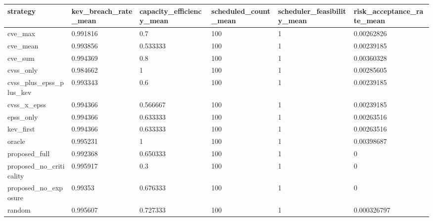 \begin{tabular}{l l l l l l}
\hline
strategy & kev\_breach\_rate\_mean & capacity\_efficiency\_mean & scheduled\_count\_mean & scheduler\_feasibility\_mean & risk\_acceptance\_rate\_mean \\
\hline
cve\_max & 0.991816 & 0.7 & 100 & 1 & 0.00262826 \\
cve\_mean & 0.993856 & 0.533333 & 100 & 1 & 0.00239185 \\
cve\_sum & 0.994369 & 0.8 & 100 & 1 & 0.00360328 \\
cvss\_only & 0.984662 & 1 & 100 & 1 & 0.00285605 \\
cvss\_plus\_epss\_plus\_kev & 0.993343 & 0.6 & 100 & 1 & 0.00239185 \\
cvss\_x\_epss & 0.994366 & 0.566667 & 100 & 1 & 0.00239185 \\
epss\_only & 0.994366 & 0.633333 & 100 & 1 & 0.00263516 \\
kev\_first & 0.994366 & 0.633333 & 100 & 1 & 0.00263516 \\
oracle & 0.995231 & 1 & 100 & 1 & 0.00398687 \\
proposed\_full & 0.992368 & 0.650333 & 100 & 1 & 0 \\
proposed\_no\_criticality & 0.995917 & 0.3 & 100 & 1 & 0 \\
proposed\_no\_exposure & 0.99353 & 0.676333 & 100 & 1 & 0 \\
random & 0.995607 & 0.727333 & 100 & 1 & 0.000326797 \\
\hline
\end{tabular}
